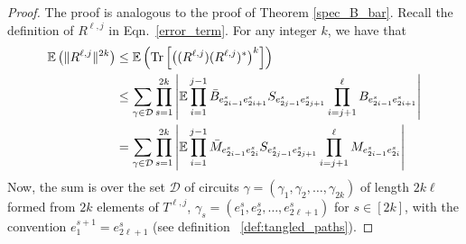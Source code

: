\begin{proof}
The proof is analogous to the proof of Theorem \ref{spec_B_bar}. Recall the definition of $R^{\ell,j}$ in Eqn.~\ref{error_term}.
For any integer $k$, we have that
\begin{align}
\E\left(\|R^{\ell,j}\|^{2k}\right)
&\leq 
\E 
\left(
\mathrm{Tr}
\left[
 \left( (R^{\ell,j}) (R^{\ell,j})^* \right)^{k}
\right]
\right)
\nonumber \\
&\leq
\sum_{ \gamma \in \mathcal{D} }
\prod_{s=1}^{2k}
\left|
\E
\prod_{i=1}^{j-1} \bar{B}_{e^s_{2i-1} e^s_{2i+1}} 
S_{e^s_{2j-1} e^s_{2j+1}}
\prod_{i=j+1}^{\ell} B_{e^s_{2i-1} e^s_{2i+1}} 
\right| 
\nonumber \\
&=
\sum_{ \gamma \in \mathcal{D} }
\prod_{s=1}^{2k}
\left|
\E
\prod_{i=1}^{j-1} \bar{M}_{e^s_{2i-1} e^s_{2i}} 
S_{e^s_{2j-1} e^s_{2j+1}}
\prod_{i=j+1}^{\ell} M_{e^s_{2i-1} e^s_{2i}} 
\right| 
\label{trace_expectation:R^l,j}
\end{align}
Now, the sum is over 
the set $\mathcal{D}$ of circuits 
$\gamma= (\gamma_1,\gamma_2,\dots,\gamma_{2k})$ of length $2k\ell$
formed from $2k$ elements of $T^{\ell,j}$, 
$\gamma_s = (e^s_1, e^s_2, \ldots, e^s_{2\ell+1} )$ for $s \in [2k]$,
with the convention $e^{s+1}_1 = e^s_{2\ell+1}$ (see definition ~\ref{def:tangled_paths}).




\end{proof}
